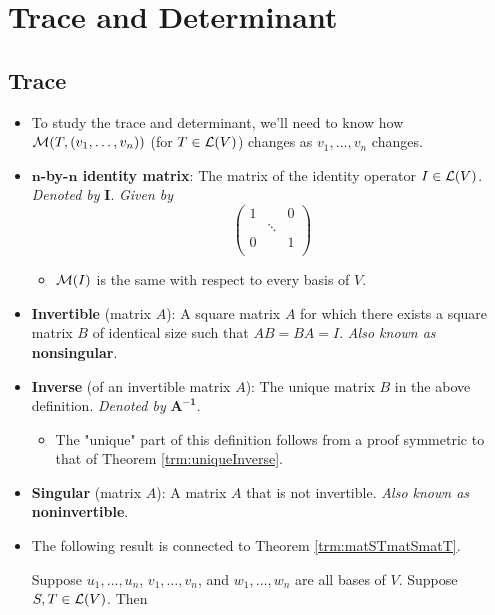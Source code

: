 \documentclass[../main.tex]{subfiles}
\begin{document}
\chapter{Trace and Determinant}
\section{Trace}
\begin{itemize}
    \item {}To study the trace and determinant, we'll need to know how $\mathcal{M}(T,(v_1,\dots,v_n))$ (for $T\in\mathcal{L}(V)$) changes as $v_1,\dots,v_n$ changes.
    \item \textbf{$\bm{n}$-by-$\bm{n}$ identity matrix}: The matrix of the identity operator $I\in\mathcal{L}(V)$. \emph{Denoted by} $\bm{I}$. \emph{Given by}
    \begin{equation*}
        \begin{pmatrix}
            1 &  & 0\\
             & \ddots & \\
            0 &  & 1\\
        \end{pmatrix}
    \end{equation*}
    \begin{itemize}
        \item $\mathcal{M}(I)$ is the same with respect to every basis of $V$.
    \end{itemize}
    \item \textbf{Invertible} (matrix $A$): A square matrix $A$ for which there exists a square matrix $B$ of identical size such that $AB=BA=I$. \emph{Also known as} \textbf{nonsingular}.
    \item \textbf{Inverse} (of an invertible matrix $A$): The unique matrix $B$ in the above definition. \emph{Denoted by} $\bm{A^{-1}}$.
    \begin{itemize}
        \item The "unique" part of this definition follows from a proof symmetric to that of Theorem \ref{trm:uniqueInverse}.
    \end{itemize}
    \item \textbf{Singular} (matrix $A$): A matrix $A$ that is not invertible. \emph{Also known as} \textbf{noninvertible}.
    \item The following result is connected to Theorem \ref{trm:matSTmatSmatT}.
    \begin{theorem}\label{trm:matST}
        Suppose $u_1,\dots,u_n$, $v_1,\dots,v_n$, and $w_1,\dots,w_n$ are all bases of $V$. Suppose $S,T\in\mathcal{L}(V)$. Then

\end{theorem}
\end{itemize}
\end{document}
